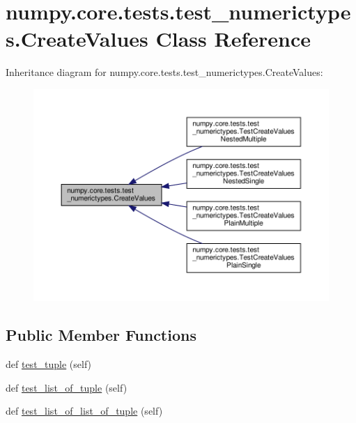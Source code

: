 \hypertarget{classnumpy_1_1core_1_1tests_1_1test__numerictypes_1_1CreateValues}{}\section{numpy.\+core.\+tests.\+test\+\_\+numerictypes.\+Create\+Values Class Reference}
\label{classnumpy_1_1core_1_1tests_1_1test__numerictypes_1_1CreateValues}


Inheritance diagram for numpy.\+core.\+tests.\+test\+\_\+numerictypes.\+Create\+Values\+:
\nopagebreak
\begin{figure}[H]
\begin{center}
\leavevmode
\includegraphics[width=350pt]{classnumpy_1_1core_1_1tests_1_1test__numerictypes_1_1CreateValues__inherit__graph}
\end{center}
\end{figure}
\subsection*{Public Member Functions}
\begin{DoxyCompactItemize}
\item 
def \hyperlink{classnumpy_1_1core_1_1tests_1_1test__numerictypes_1_1CreateValues_aa4aa2c07bedf3003bc47580b70782fa5}{test\+\_\+tuple} (self)
\item 
def \hyperlink{classnumpy_1_1core_1_1tests_1_1test__numerictypes_1_1CreateValues_a76c3064c01a825372224c3bdc393e756}{test\+\_\+list\+\_\+of\+\_\+tuple} (self)
\item 
def \hyperlink{classnumpy_1_1core_1_1tests_1_1test__numerictypes_1_1CreateValues_a3ffa677ee43711cbd4bd6c9f10379bfb}{test\+\_\+list\+\_\+of\+\_\+list\+\_\+of\+\_\+tuple} (self)
\end{DoxyCompactItemize}


